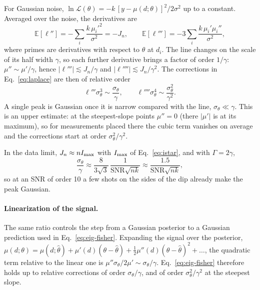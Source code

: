 For Gaussian noise, $\ln\mathcal L(\theta)=-k\,[y-\mu(d;\theta)]^2/2\sigma^2$ up to a constant. Averaged over the
noise, the derivatives are
\begin{equation*}
  \mathbb E[\ell'']=-\sum_i\frac{k\,\mu_i'^2}{\sigma^2}=-J_n,\qquad
  \mathbb E[\ell''']=-3\sum_i\frac{k\,\mu_i'\mu_i''}{\sigma^2},
\end{equation*}
where primes are derivatives with respect to $\theta$ at $d_i$. The line changes on the scale
of its half width $\gamma$, so each further derivative brings a factor of order $1/\gamma$: $\mu''\sim\mu'/\gamma$,
hence $|\ell'''|\lesssim J_n/\gamma$ and $|\ell''''|\lesssim J_n/\gamma^2$. The corrections in Eq.~\eqref{eq:laplace} are
then of relative order
\begin{equation}
  \ell'''\sigma_\theta^3\sim\frac{\sigma_\theta}{\gamma},\qquad \ell''''\sigma_\theta^4\sim\frac{\sigma_\theta^2}{\gamma^2}.
  \label{eq:gauss-corrections}
\end{equation}
A single peak is Gaussian once it is narrow compared with the line, $\sigma_\theta\ll\gamma$. This is an upper
estimate: at the steepest-slope points $\mu''=0$ (there $|\mu'|$ is at its maximum), so for measurements placed there
the cubic term vanishes on average and the corrections start at order $\sigma_\theta^2/\gamma^2$.

In the data limit, $J_n\approx nI_{\rm max}$ with $I_{\rm max}$ of Eq.~\eqref{eq:istar}, and with $\Gamma=2\gamma$,
\begin{equation*}
  \frac{\sigma_\theta}{\gamma}\approx\frac{8}{3\sqrt3}\,\frac{1}{\mathrm{SNR}\sqrt{nk}}
  \approx\frac{1.5}{\mathrm{SNR}\sqrt{nk}} ,
\end{equation*}
so at an SNR of order 10 a few shots on the sides of the dip already make the peak Gaussian.

\paragraph{Linearization of the signal.} The same ratio controls the step from a Gaussian posterior to a Gaussian
prediction used in Eq.~\eqref{eq:eig-fisher}. Expanding the signal over the posterior,
$\mu(d;\theta)=\mu(d;\hat\theta)+\mu'(d)(\theta-\hat\theta)+\tfrac12\mu''(d)(\theta-\hat\theta)^2+\dots$, the
quadratic term relative to the linear one is $\mu''\sigma_\theta/2\mu'\sim\sigma_\theta/\gamma$. Eq.~\eqref{eq:eig-fisher}
therefore holds up to relative corrections of order $\sigma_\theta/\gamma$, and of order $\sigma_\theta^2/\gamma^2$
at the steepest slope.

